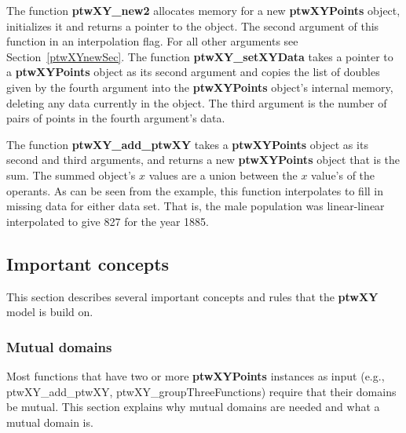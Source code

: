 \documentclass[11pt]{article}
\newcommand{\highlight}[1]{{\bf #1}}
\begin{document}
The function \highlight{ptwXY\_new2} allocates memory for
a new \highlight{ptwXYPoints} object, initializes it and returns a pointer to the object. The second
argument of this function in an interpolation flag. For all other arguments see Section~\ref{ptwXYnewSec}. The
function \highlight{ptwXY\_setXYData} takes a pointer to a \highlight{ptwXYPoints} object as its second argument and copies 
the list of doubles given by the fourth argument into the \highlight{ptwXYPoints} object's internal memory, deleting
any data currently in the object. 
The third argument is the number of pairs of points in the fourth argument's data. 

The function \highlight{ptwXY\_add\_ptwXY} takes a \highlight{ptwXYPoints} object
as its second and third arguments, and returns a new \highlight{ptwXYPoints} object that is the sum. 
The summed object's $x$ values are a union between the $x$ value's of the operants.  As can be seen
from the example, this function interpolates to fill in missing data for either data set. That is, the male population
was linear-linear interpolated to give 827 for the year 1885.

\subsection{Important concepts}
This section describes several important concepts and rules that the \highlight{ptwXY} model is build on.

\subsubsection{Mutual domains}
Most functions that have two or more \highlight{ptwXYPoints} instances as input (e.g., ptwXY\_add\_ptwXY, ptwXY\_groupThreeFunctions) require
that their domains be mutual. This section explains why mutual domains are needed and what a mutual domain is.
\end{document}
